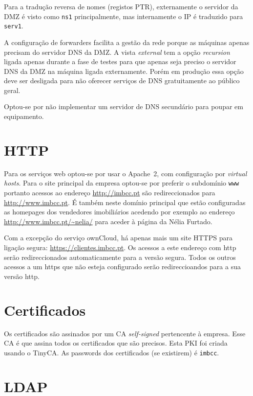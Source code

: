\documentclass[12pt,a4paper]{report}
\begin{document}
Para a tradução reversa de nomes (registos PTR), externamente o servidor da DMZ é visto como \texttt{ns1} principalmente, mas internamente o IP é traduzido para \texttt{serv1}.

A configuração de forwarders facilita a gestão da rede porque as máquinas apenas precisam do servidor DNS da DMZ. A vista \textit{external} tem a opção \textit{recursion} ligada apenas durante a fase de testes para que apenas seja preciso o servidor DNS da DMZ na máquina ligada externamente. Porém em produção essa opção deve ser desligada para não oferecer serviços de DNS gratuitamente ao público geral.

Optou-se por não implementar um servidor de DNS secundário para poupar em equipamento. 

\section{HTTP}

Para os serviços web optou-se por usar o Apache~2, com configuração por \textit{virtual hosts}. Para o site principal da empresa optou-se por preferir o subdomínio \texttt{www} portanto acessos ao endereço \url{http://imbcc.pt} são redireccionados para \url{http://www.imbcc.pt}. É também neste domínio principal que estão configuradas as homepages dos vendedores imobiliários acedendo por exemplo ao endereço \url{http://www.imbcc.pt/~nelia/} para aceder à página da Nélia Furtado.

Com a excepção do serviço ownCloud, há apenas mais um site HTTPS para ligação segura: \url{https://clientes.imbcc.pt}. Os acessos a este endereço com http serão redireccionados automaticamente para a versão segura. Todos os outros acessos a um https que não esteja configurado serão redireccioandos para a sua versão http.

\section{Certificados}

Os certificados são assinados por um CA \textit{self-signed} pertencente à empresa. Esse CA é que assina todos os certificados que são precisos. Esta PKI foi criada usando o TinyCA. As passwords dos certificados (se existirem) é \texttt{imbcc}.

\section{LDAP}
\end{document}
